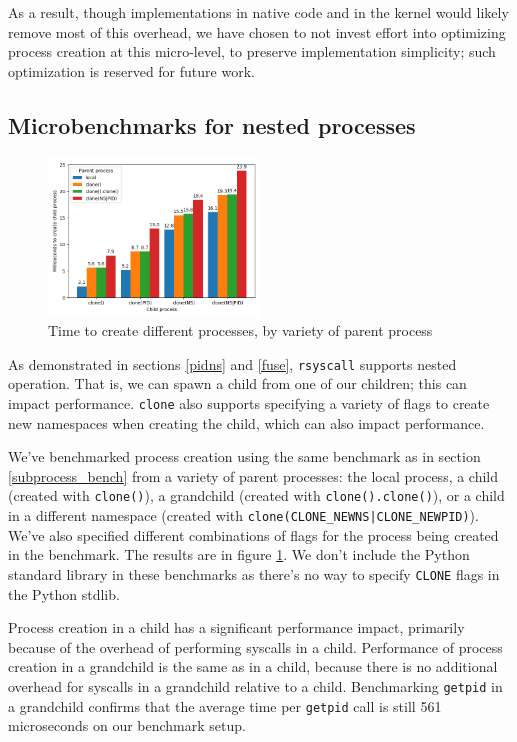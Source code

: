 \documentclass[letterpaper,twocolumn,10pt]{article}
\begin{document}
As a result, though implementations in native code and in the kernel would likely remove most of this overhead,
we have chosen to not invest effort into optimizing process creation at this micro-level,
to preserve implementation simplicity;
such optimization is reserved for future work.

\subsection{Microbenchmarks for nested processes}\label{clone_bench}
\begin{figure}[h!]
\centering
 \includegraphics[width=0.5\textwidth]{clone_bench}
 \caption{Time to create different processes, by variety of parent process}
 \label{fig:clone_bench}
\end{figure}

As demonstrated in sections \ref{pidns} and \ref{fuse},
\texttt{rsyscall} supports nested operation.
That is, we can spawn a child from one of our children;
this can impact performance.
\texttt{clone} also supports specifying a variety of flags to create new namespaces when creating the child,
which can also impact performance.

We've benchmarked process creation using the same benchmark as in section \ref{subprocess_bench}
from a variety of parent processes: the local process,
a child (created with \texttt{clone()}),
a grandchild (created with \texttt{clone().clone()}),
or a child in a different namespace (created with \verb=clone(CLONE_NEWNS|CLONE_NEWPID)=).
We've also specified different combinations of flags for the process being created in the benchmark.
The results are in figure \ref{fig:clone_bench}.
We don't include the Python standard library in these benchmarks
as there's no way to specify \texttt{CLONE} flags in the Python stdlib.

Process creation in a child has a significant performance impact,
primarily because of the overhead of performing syscalls in a child.
Performance of process creation in a grandchild is the same as in a child,
because there is no additional overhead for syscalls in a grandchild relative to a child.
Benchmarking \texttt{getpid} in a grandchild
confirms that the average time per \texttt{getpid} call is still 561 microseconds on our benchmark setup.
\end{document}
